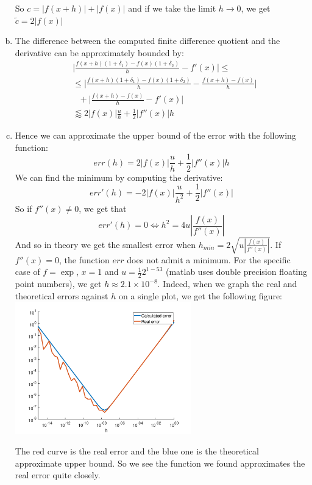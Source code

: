 \documentclass{article}
\begin{document}
\begin{enumerate}[(a)]
      So $c = |f(x + h)| + |f(x)|$ and if we take the limit
      $h \to 0$, we get $\tilde{c} = 2|f(x)|$
   \item 
      The difference between the computed finite difference quotient and the 
      derivative can be approximately bounded by:
      \begin{align*}
         &\Bigg|\frac{f(x+h)(1 + \delta_1) - f(x)(1 + \delta_2)}{h}
         - f'(x)\Bigg| \leq \\
         &\leq 
         \Bigg|\frac{f(x+h)(1 + \delta_1) - f(x)(1 + \delta_2)}{h} -
         \frac{f(x+h) - f(x)}{h}\Bigg| \\
         &~~~+ \Bigg|\frac{f(x+h) - f(x)}{h} - f'(x)\Bigg| \\
         &\lessapprox 2|f(x)|\frac{u}{h} + \frac{1}{2}|f''(x)|h
      \end{align*}
   \item
      Hence we can approximate the upper bound of the error with the following function:
      \begin{equation}
         err(h) = 2|f(x)|\frac{u}{h} + \frac{1}{2}|f''(x)|h
      \end{equation}
      We can find the minimum by computing the derivative:
      \begin{equation}
         err'(h) = -2|f(x)|\frac{u}{h^2} + \frac{1}{2}|f''(x)|
      \end{equation}
      So if $f''(x) \neq 0$, we get that
      \begin{equation}
         err'(h) = 0 \iff h^2 = 4u\left|\frac{f(x)}{f''(x)}\right|
      \end{equation}
      And so in theory we get the smallest error when
      $h_{min} = 2\sqrt{u\left|\frac{f(x)}{f''(x)}\right|}$.
      If $f''(x) = 0$, the function $err$ does not admit a minimum.
      For the specific case of $f = \exp$, $x = 1$ and
      $u = \frac{1}{2}2^{1 - 53}$ (matlab uses double precision floating
      point numbers), we get $h \approx 2.1 \times 10^{-8}$.
      Indeed, when we graph the real and theoretical errors against $h$ on a single plot, we
      get the following figure:\\
      \includegraphics[width=0.6\textwidth]{figure}

      The red curve is the real error and the blue one is the
      theoretical approximate upper bound.
      So we see the function we found approximates the real error
      quite closely.
\end{enumerate}
\end{document}
